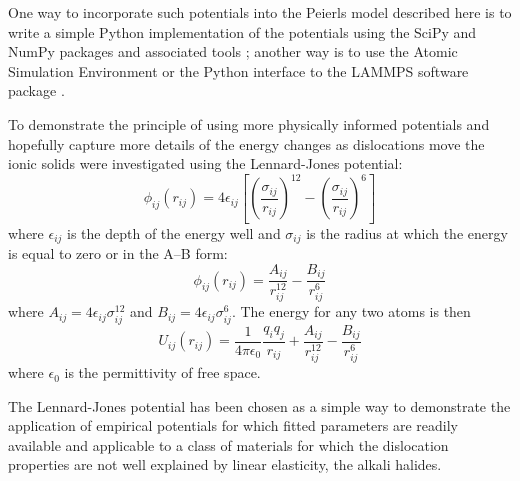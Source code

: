 One way to incorporate such potentials into the Peierls model described here is to write a simple Python implementation of the potentials using the SciPy and NumPy packages and associated tools \cite{Numpy2011,IPython2007,Millman2007,SciPy2001}; another way is to use the Atomic Simulation Environment \cite{ASE2017} or the Python interface to the LAMMPS software package \cite{Plimpton1995,LAMMPS_web}.



To demonstrate the principle of using more physically informed potentials and hopefully capture more details of the energy changes as dislocations move the ionic solids were investigated using the Lennard-Jones potential:
\begin{equation}
\phi_{ij}(r_{ij}) = 4\epsilon_{ij} \left[ \left( \frac{\sigma_{ij}}{r_{ij}}\right)^{12}-     \left( \frac{\sigma_{ij}}{r_{ij}}\right)^6   \right]
\end{equation}
where $\epsilon_{ij}$ is the depth of the energy well and $\sigma_{ij}$ is the radius at which the energy is equal to zero or in the A--B form:
\begin{equation}
\phi_{ij}(r_{ij}) = \frac{A_{ij}}{r_{ij}^{12}} - \frac{B_{ij}}{r_{ij}^{6}}
\end{equation}
where $A_{ij} = 4\epsilon_{ij}\sigma_{ij}^{12}$ and $B_{ij} = 4 \epsilon_{ij} \sigma_{ij}^{6}$. The energy for any two atoms is then 
\begin{equation}
U_{ij}(r_{ij}) = \frac{1}{4\pi\epsilon_0} \frac{q_i q_j}{r_{ij}} + \frac{A_{ij}}{r_{ij}^{12}} - \frac{B_{ij}}{r_{ij}^{6}}
\end{equation}
where $\epsilon_0$ is the permittivity of free space.

The Lennard-Jones potential  has been chosen as a simple way to demonstrate the application of empirical potentials for which fitted parameters are readily available \cite{Mao2014} and applicable to a class of materials for which the dislocation properties are not well explained by linear elasticity, the alkali halides.



